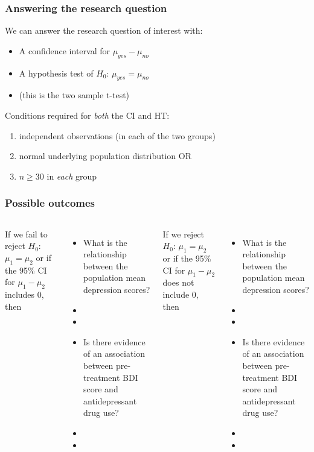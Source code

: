 \begin{frame}
\frametitle{Answering the research question}
We can answer the research question of interest with:
\begin{itemize}
    \item
    A confidence interval for $\mu_{yes}-\mu_{no}$
    \item
    A hypothesis test of $H_0$: $\mu_{yes}=\mu_{no}$
    \item[]
    (this is the two sample t-test)
\end{itemize}
\vskip10pt
Conditions required for \emph{both} the CI and HT:
\begin{enumerate}
    \item
    independent observations (in each of the two groups)
    \item
    normal underlying population distribution OR
    \item[]
    $n \geq 30$ in \emph{each} group
\end{enumerate}
\end{frame}



\begin{frame}
\frametitle{Possible outcomes}
\begin{columns}
If we fail to reject $H_0$: $\mu_1=\mu_2$ or if the 95\% CI for $\mu_1-\mu_2$ includes 0, then
\begin{itemize}
    \item
   What is the relationship between the population mean depression scores?
   \item[]
   \item[]
    \item
    Is there evidence of an association between pre-treatment BDI score and antidepressant drug use?
    \item[]
    \item[]
\end{itemize}
If we reject $H_0$: $\mu_1=\mu_2$ or if the 95\% CI for $\mu_1-\mu_2$ does not include 0, then
\begin{itemize}
    \item
   What is the relationship between the population mean depression scores?
   \item[]
   \item[]
    \item
    Is there evidence of an association between pre-treatment BDI score and antidepressant drug use?
    \item[]
    \item[]
\end{itemize}
\end{columns}
\end{frame}

